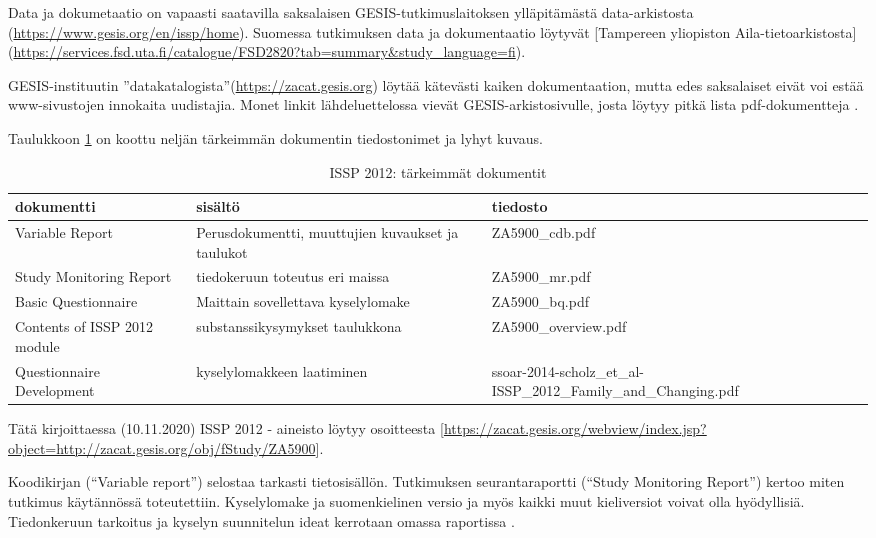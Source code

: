 \documentclass[
  finnish,
]{book}
\begin{document}
Data ja dokumetaatio on vapaasti saatavilla saksalaisen GESIS-tutkimuslaitoksen
ylläpitämästä data-arkistosta
(\url{https://www.gesis.org/en/issp/home}). Suomessa tutkimuksen data ja dokumentaatio
löytyvät {[}Tampereen yliopiston Aila-tietoarkistosta{]}
(\url{https://services.fsd.uta.fi/catalogue/FSD2820?tab=summary\&study_language=fi}).

GESIS-instituutin ''datakatalogista''(\url{https://zacat.gesis.org})
löytää kätevästi kaiken dokumentaation\citep{RefWorks:doc:5b6c7f6ce4b0e4e15164ab1a},
mutta edes saksalaiset eivät voi estää www-sivustojen innokaita uudistajia.
Monet linkit lähdeluettelossa vievät GESIS-arkistosivulle,
josta löytyy pitkä lista pdf-dokumentteja \citep{RefWorks:doc:5b6c7b0de4b0fd36f5bb4c2a}.

Taulukkoon \ref{tab:ISSPdocsTable} on koottu neljän tärkeimmän dokumentin
tiedostonimet ja lyhyt kuvaus.

\begin{table}

\caption{\label{tab:ISSPdocsTable} ISSP 2012: tärkeimmät dokumentit}
\centering
\begin{tabular}[t]{lll}
\toprule
dokumentti & sisältö & tiedosto\\
\midrule
Variable Report & Perusdokumentti, muuttujien kuvaukset ja taulukot & ZA5900\_cdb.pdf\\
Study Monitoring Report & tiedokeruun toteutus eri maissa & ZA5900\_mr.pdf\\
Basic Questionnaire & Maittain sovellettava kyselylomake & ZA5900\_bq.pdf\\
Contents of ISSP 2012 module & substanssikysymykset taulukkona & ZA5900\_overview.pdf\\
Questionnaire Development & kyselylomakkeen laatiminen & ssoar-2014-scholz\_et\_al-ISSP\_2012\_Family\_and\_Changing.pdf\\
\bottomrule
\end{tabular}
\end{table}

Tätä kirjoittaessa (10.11.2020) ISSP 2012 - aineisto löytyy osoitteesta
{[}\url{https://zacat.gesis.org/webview/index.jsp?object=http://zacat.gesis.org/obj/fStudy/ZA5900}{]}.

Koodikirjan (``Variable report'') \citep{RefWorks:doc:5bb9041be4b06677e5e61f83} selostaa
tarkasti tietosisällön. Tutkimuksen seurantaraportti (``Study Monitoring Report'')
\citep{RefWorks:doc:5c053d69e4b0191a580d6451} kertoo miten tutkimus käytännössä
toteutettiin. Kyselylomake \citep{RefWorks:doc:5bb9044fe4b0dfeb95352229} ja
suomenkielinen versio \citep{RefWorks:doc:5bb90a0ae4b018435936a488} ja myös kaikki muut
kieliversiot voivat olla hyödyllisiä. Tiedonkeruun tarkoitus ja kyselyn
suunnitelun ideat kerrotaan omassa raportissa \citep{RefWorks:doc:5f9439fde4b04741789a2187}.
\end{document}
